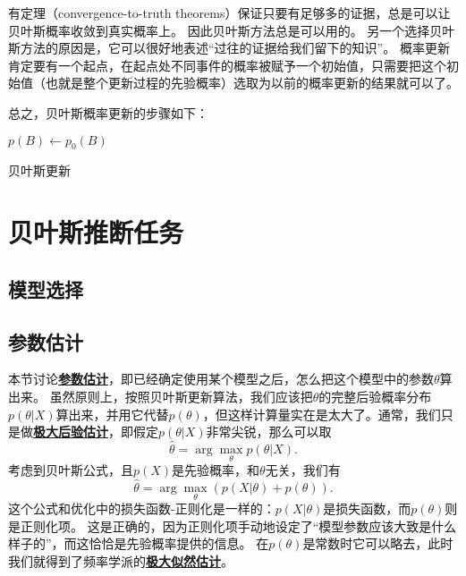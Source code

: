\documentclass[hyperref, UTF8, a4paper]{ctexart}
\newcommand*{\argmax}{\arg\max}
\newcommand*{\concept}[1]{\underline{\textbf{#1}}}
\begin{document}
有定理（convergence-to-truth theorems）保证只要有足够多的证据，总是可以让贝叶斯概率收敛到真实概率上。
因此贝叶斯方法总是可以用的。
另一个选择贝叶斯方法的原因是，它可以很好地表述“过往的证据给我们留下的知识”。
概率更新肯定要有一个起点，在起点处不同事件的概率被赋予一个初始值，只需要把这个初始值（也就是整个更新过程的先验概率）选取为以前的概率更新的结果就可以了。

总之，贝叶斯概率更新的步骤如下：

\begin{algorithm}[H]

    \DontPrintSemicolon
    \SetAlgoLined

    
    $p(B) \leftarrow p_0(B)$ \;
    \;

    \caption{贝叶斯更新}
    \label{alg:bayesian-updating}
\end{algorithm}

\section{贝叶斯推断任务}

\subsection{模型选择}

\subsection{参数估计}

本节讨论\concept{参数估计}，即已经确定使用某个模型之后，怎么把这个模型中的参数$\theta$算出来。
虽然原则上，按照贝叶斯更新算法，我们应该把$\theta$的完整后验概率分布$p(\theta | X)$算出来，并用它代替$p(\theta)$，但这样计算量实在是太大了。通常，我们只是做\concept{极大后验估计}，即假定$p(\theta | X)$非常尖锐，那么可以取
\[
    \hat{\theta} = \argmax_\theta p(\theta | X).
\]
考虑到贝叶斯公式，且$p(X)$是先验概率，和$\theta$无关，我们有
\begin{equation}
    \hat{\theta} = \argmax_\theta (p(X | \theta) + p(\theta)).
    \label{eq:max-post-estimation}
\end{equation}
这个公式和优化中的损失函数-正则化是一样的：$p(X | \theta)$是损失函数，而$p(\theta)$则是正则化项。
这是正确的，因为正则化项手动地设定了“模型参数应该大致是什么样子的”，而这恰恰是先验概率提供的信息。
在$p(\theta)$是常数时它可以略去，此时我们就得到了频率学派的\concept{极大似然估计}。
\end{document}
